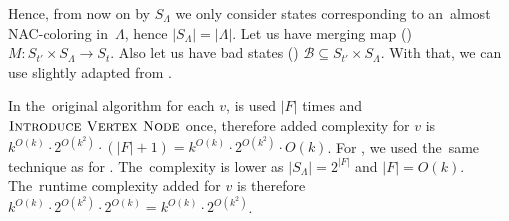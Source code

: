 Hence, from now on by \( S_\Lambda \) we only consider states corresponding to
an~almost NAC-coloring in~\( \Lambda \), hence \( |S_\Lambda| = |\Lambda| \).
%
Let us have%
merging map ()
\( M : S_{t'} \times S_\Lambda \to S_t \).
Also let us have bad states ()
\( \mathcal{B} \subseteq S_{t'} \times S_\Lambda \).
%
With that, we can use slightly adapted 
from \JoinNode{}.


In the~original algorithm for each \( v \),
\IntroduceEdgeNode{} is used \( |F| \) times
and \( \textsc{Introduce Vertex Node}{} \) once, therefore added complexity for \( v \)
is \( {k}^{O(k)} \cdot 2^{O(k^2)} \cdot (|F| + 1) = {k}^{O(k)} \cdot 2^{O(k^2)} \cdot O(k) \).
%
For \IntroduceVertexWithEdgesNode{},
we used the~same technique as for \JoinNode{}.
The~complexity is lower as \( |S_\Lambda| = 2^{|F|} \) and \( |F| = O(k) \).
The~runtime complexity added for \( v \) is therefore
\( {k}^{O(k)} \cdot 2^{O(k^2)} \cdot 2^{O(k)} = {k}^{O(k)} \cdot 2^{O(k^2)}\).

